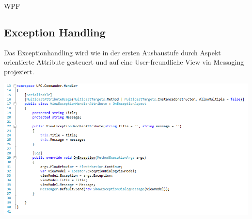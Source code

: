 \begin{section}{WPF}
\subsection{Exception Handling}
Das Exceptionhandling wird wie in der ersten Ausbaustufe durch Aspekt orientierte Attribute gesteuert und auf eine User-freundliche View via Messaging projeziert. 

\includegraphics[angle=0, scale=0.45]{./img/exception.PNG}
\FloatBarrier

\end{section}

